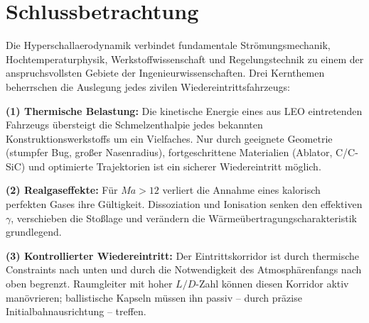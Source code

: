 ﻿\documentclass[12pt,a4paper]{article}
\newcommand{\Ma}{M\!a}
\begin{document}
\section{Schlussbetrachtung}

Die Hyperschallaerodynamik verbindet fundamentale Strömungsmechanik,
Hochtemperaturphysik, Werkstoffwissenschaft und Regelungstechnik zu einem
der anspruchsvollsten Gebiete der Ingenieurwissenschaften. Drei Kernthemen
beherrschen die Auslegung jedes zivilen Wiedereintrittsfahrzeugs:

\textbf{(1) Thermische Belastung:} Die kinetische Energie eines aus LEO
eintretenden Fahrzeugs übersteigt die Schmelzenthalpie jedes bekannten
Konstruktionswerkstoffs um ein Vielfaches. Nur durch geeignete Geometrie
(stumpfer Bug, großer Nasenradius), fortgeschrittene Materialien (Ablator,
C/C-SiC) und optimierte Trajektorien ist ein sicherer Wiedereintritt möglich.

\textbf{(2) Realgaseffekte:} Für $\Ma > 12$ verliert die Annahme eines
kalorisch perfekten Gases ihre Gültigkeit. Dissoziation und Ionisation senken
den effektiven $\gamma$, verschieben die Stoßlage und verändern die
Wärmeübertragungscharakteristik grundlegend.

\textbf{(3) Kontrollierter Wiedereintritt:} Der Eintrittskorridor ist durch
thermische Constraints nach unten und durch die Notwendigkeit des Atmosphärenfangs
nach oben begrenzt. Raumgleiter mit hoher $L/D$-Zahl können diesen Korridor
aktiv manövrieren; ballistische Kapseln müssen ihn passiv -- durch präzise
Initialbahnausrichtung -- treffen.

\bigskip
\end{document}
